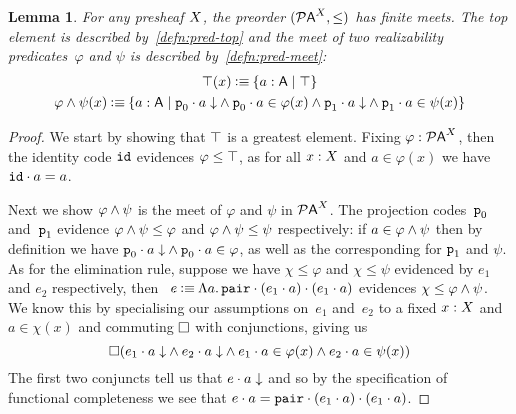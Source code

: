 \documentclass[12pt]{article}
\newtheorem{lemm}[thrm]{Lemma}
\begin{document}

\begin{lemm}
  For any presheaf \(X\), the preorder \(({\mathcal{P}{\mathsf{A}}}^{X}, \leq)\) has finite
  meets.
  The top element is described by~\ref{defn:pred-top} and the meet of two
  realizability predicates~\(\varphi\) and \(\psi\) is described
  by~\ref{defn:pred-meet}:
  \begin{gather}
    \TTop{\X}(x)
    \IsDefined
    \ISetComp{a:\A}{\ITop}
    \label{defn:pred-top}
    \\
    \TAnd{\varphi}{\psi}{\X}(x)
    \IsDefined
    \ISetComp{a:\A}{\IAnd%
      {\IAnd{\ITotal{\IAp{\IFstCode}{a}}}{\IAp{\IFstCode}{a}\in\varphi(x)}}%
      {\IAnd{\ITotal{\IAp{\ISndCode}{a}}}{\IAp{\ISndCode}{a}\in\psi(x)}}
    }
    \label{defn:pred-meet}
  \end{gather}
\end{lemm}
\begin{proof}
  We start by showing that \(\top\) is a greatest element.
  Fixing \(\varphi:{\mathcal{P}{\mathsf{A}}}^{X}\), then the identity code \(\texttt{id}\)
  evidences \(\varphi \leq \top\), as for all \(x : X\) and
  \(a \in \varphi(x)\) we have \({\texttt{id}}\cdot{a} = a\).

  Next we show \({\varphi}\land{\psi}\) is the meet of \(\varphi\) and
  \(\psi\) in \({\mathcal{P}{\mathsf{A}}}^{X}\).
  The projection codes~\(\texttt{p}_0\) and~\(\texttt{p}_1\) evidence
  \({\varphi}\land{\psi}\leq\varphi\) and
  \({\varphi}\land{\psi}\leq\psi\) respectively:
  if \(a \in {\varphi}\land{\psi}\) then by definition we have
  \({{{\texttt{p}_0}\cdot{a}}\downarrow}\land{{\texttt{p}_0}\cdot{a}\in\varphi}\), as
  well as the corresponding for \(\texttt{p}_1\) and \(\psi\).
  As for the elimination rule, suppose we have \(\chi\leq\varphi\) and
  \(\chi\leq\psi\) evidenced by \(e_{1}\) and \(e_{2}\) respectively,
  then~%
  \(
    e \mathbin{\vcentcolon\equiv}
    \Lambda{a}.\,{{{\texttt{pair}}\cdot{({e_{1}}\cdot{a})}}\cdot{({e_{1}}\cdot{a})}}
  \)
  evidences \(\chi\leq{\varphi}\land{\psi}\).
  We know this by specialising our assumptions on~\(e_{1}\) and~\(e_{2}\)
  to a fixed \(x:X\) and \(a\in\chi(x)\) and commuting \(\Box\) with
  conjunctions, giving us
  \[
    \Box{
      ({
        {{{e_{1}}\cdot{a}}\downarrow}\land{{{e_{2}}\cdot{a}}\downarrow}
      }\land{
        {{e_{1}}\cdot{a}\in\varphi(x)}\land{{e_{2}}\cdot{a}\in\psi(x)}
      })
    }
  \]
  The first two conjuncts tell us that \({{e}\cdot{a}}\downarrow\) and so by the
  specification of functional completeness we see that
  \({e}\cdot{a} = {{\texttt{pair}}\cdot{({e_{1}}\cdot{a})}}\cdot{({e_{1}}\cdot{a})}\).
\end{proof}
\end{document}
